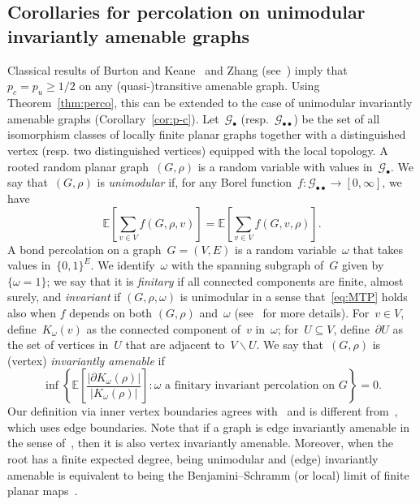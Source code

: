 \documentclass[11pt,letterpaper]{amsart}
\newcounter{n}
\numberwithin{n}{section}
\theoremstyle{plain}
\theoremstyle{definition}
\theoremstyle{remark}
\renewcommand\setminus\smallsetminus
\newcommand\E{\mathbb E}
\newcommand\calG{\mathcal G}
\newcommand{\1}{\mathbbm{1}}
\renewcommand\subset\subseteq
\begin{document}
\subsection{Corollaries for percolation on unimodular invariantly amenable graphs}
\label{sec:divide-color}

Classical results of Burton and Keane~\cite{BurKea89} and Zhang (see~\cite[Chapter~11]{Gri99a}) imply that~$p_c=p_u\geq 1/2$ on any (quasi-)transitive amenable graph.
Using Theorem~\ref{thm:perco}, this can be extended to the case of unimodular invariantly amenable graphs (Corollary~\ref{cor:p-c}).
Let~$\calG_\bullet$ (resp.~$\calG_{\bullet\bullet}$) be the set of all isomorphism classes of locally finite planar graphs together with a distinguished vertex (resp. two distinguished vertices) equipped with the local topology.
A rooted random planar graph~$(G,\rho)$ is a random variable with values in~$\calG_{\bullet}$.
We say that~$(G,\rho)$ is {\em unimodular} if, for any Borel function~$f\colon \calG_{\bullet\bullet}\to [0,\infty]$, we have
\begin{equation}\label{eq:MTP}
	\E \left[ \sum_{v\in V} f(G, \rho, v) \right] = \E \left[ \sum_{v\in V} f(G, v, \rho) \right]. \tag{MTP}
\end{equation}
A bond percolation on a graph~$G=(V,E)$ is a random variable~$\omega$ that takes values in~$\{0,1\}^E$.
We identify~$\omega$ with the spanning subgraph of~$G$ given by~$\{\omega = 1\}$; we say that it is {\em finitary} if all connected components are finite, almost surely, and {\em invariant} if $(G,\rho,\omega)$ is unimodular in a sense that~\eqref{eq:MTP} holds also when $f$ depends on both $(G,\rho)$ and~$\omega$ (see~\cite[Section~2]{AngHutNacRay18} for more details).
For~$v\in V$, define~$K_\omega(v)$ as the connected component of~$v$ in~$\omega$;
for~$U\subset V$, define~$\partial U$ as the set of vertices in~$U$ that are adjacent to~$V\setminus U$.
We say that~$(G,\rho)$ is (vertex) {\em invariantly amenable} if
\[
	\inf \left\{ \E\left[\frac{|\partial K_\omega(\rho)|}{|K_\omega(\rho)|}\right] \colon \omega \text{ a finitary invariant percolation on } G \right\} = 0.
\]
Our definition via inner vertex boundaries agrees with~\cite{AldLyo07} and is different from~\cite{AngHutNacRay18}, which uses edge boundaries.
Note that if a graph is edge invariantly amenable in the sense of~\cite{AngHutNacRay18}, then it is also vertex invariantly amenable.
Moreover, when the root has a finite expected degree, being unimodular and (edge) invariantly amenable is equivalent to being the Benjamini--Schramm (or local) limit of finite planar maps~\cite{LipTar80,AngHutNacRay18}.
\end{document}
